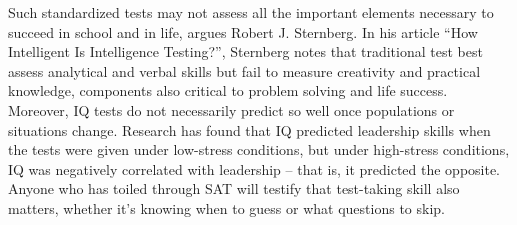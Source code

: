 \documentclass[a4paper]{article}
\begin{document}
\par
Such standardized tests may not assess all the important elements necessary to succeed in school and in life, argues Robert J. Sternberg. In his article “How Intelligent Is Intelligence Testing?”, Sternberg notes that traditional test best assess analytical and verbal skills but fail to measure creativity and practical knowledge, components also critical to problem solving and life success. Moreover, IQ tests do not necessarily predict so well once populations or situations change. Research has found that IQ predicted leadership skills when the tests were given under low-stress conditions, but under high-stress conditions, IQ was negatively correlated with leadership – that is, it predicted the opposite. Anyone who has toiled through SAT will testify that test-taking skill also matters, whether it’s knowing when to guess or what questions to skip.
\end{document}
